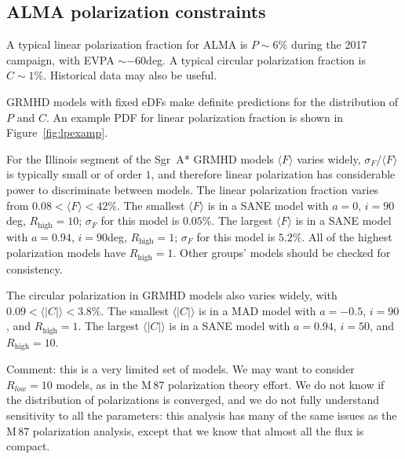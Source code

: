 \documentclass[twocolumn,tighten,dvipsnames]{aastex63}
\newcommand\sgra{Sgr~A*\xspace}
\def\M87{M\,87\xspace}
\newcommand\Rh{R_\mathrm{high}}
\newcommand\<{{\langle}}
\renewcommand\>{{\rangle}} %
\begin{document}
\subsection{ALMA polarization constraints}
\label{sec:polconst}

A typical linear polarization fraction for ALMA is $P \sim 6\%$ during the 2017 campaign, with EVPA $\sim -60$deg.  A typical circular polarization fraction is $C \sim 1\%$.  Historical data may also be useful.

GRMHD models with fixed eDFs make definite predictions for the distribution of $P$ and $C$.  An example PDF for linear polarization fraction is shown in Figure~\ref{fig:lpexamp}.

\begin{figure*}
  \caption{Left: distribution of linear polarization fraction from a MAD model with $a = 0$, $i = 30$deg, $\Rh = 10$. Right: distribution of circular polarization fraction for the same model.}
  \label{fig:lpexamp}
\end{figure*}

For the Illinois segment of the \sgra GRMHD models $\< F\>$ varies widely, $\sigma_F/\<F\>$ is typically small or of order $1$, and therefore linear polarization has considerable power to discriminate between models.  The linear polarization fraction varies from $0.08 < \<F\> < 42 \%$.  The smallest $\<F\>$ is in a SANE model with $a = 0$, $i = 90$deg, $\Rh = 10$; $\sigma_F$ for this model is $0.05\%$. The largest $\<F\>$ is in a SANE model with $a = 0.94$, $i = 90$deg, $\Rh = 1$; $\sigma_F$ for this model is $5.2\%$.  All of the highest polarization models have $\Rh = 1$.  Other groups' models should be checked for consistency.

The circular polarization in GRMHD models also varies widely, with  $0.09 < \<|C|\> < 3.8 \%$.  The smallest $\<|C|\>$ is in a MAD model with $a = -0.5$, $i = 90$, and $\Rh = 1$.  The largest $\<|C|\>$ is in a SANE model with $a = 0.94$, $i = 50$, and $\Rh = 10$.

Comment: this is a very limited set of models.  We may want to consider $R_{low} = 10$ models, as in the \M87 polarization theory effort.   We do not know if the distribution of polarizations is converged, and we do not fully understand sensitivity to all the parameters: this analysis has many of the same issues as the \M87 polarization analysis, except that we know that almost all the flux is compact.
\end{document}
